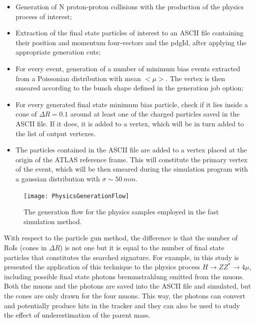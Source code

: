 \documentclass[a4paper,twoside,12pt]{article}
\begin{document}
\begin{itemize}
\item Generation of N proton-proton collisions with the production of the physics process of
interest;
\item Extraction of the final state particles of interest to an ASCII file containing their
position and momentum four-vectors and the pdgId, after applying the appropriate generation cuts;
\item For every event, generation of a number of minimum bias events extracted from a Poissonian distribution with mean $<\mu>$. The vertex is then smeared according to the
bunch shape defined in the generation job option;
\item For every generated final state minimum bias particle, check if it lies inside a cone of 
$\Delta R = 0.1$ around at least one of the charged particles saved in the ASCII file. If it does,
it is added to a vertex, which will be in turn added to the list of output vertexes.
\item The particles contained in the ASCII file are added to a vertex placed at the origin
of the ATLAS reference frame. This will constitute the primary vertex of the event, which
will be then smeared during the simulation program with a gaussian distribution with $\sigma \sim 50\ mm$.

\end{itemize}

\begin{figure} [h]
	\texttt{[image: PhysicsGenerationFlow]}
	\caption{The generation flow for the physics samples employed in the fast 
	simulation method. }
	\label{fig:PhysicsGenerationFlow}
\end{figure}

With respect to the particle gun method, the difference is that the number of RoIs (cones in
$\Delta R$) is not one but it is equal to the number of final state particles that constitutes the
searched signature. For example,
in this study is presented the application of this technique to the physics process
$H \rightarrow ZZ^* \rightarrow 4\mu$, including possible final state photons bremmstrahlung emitted from the muons. Both the muons and the photons are saved into the 
ASCII file and simulated, but the cones are only drawn for the four muons. This way, the photons can convert and potentially produce hits in the
tracker and they can also be used to study the effect of underestimation of the parent mass.\\
\end{document}
